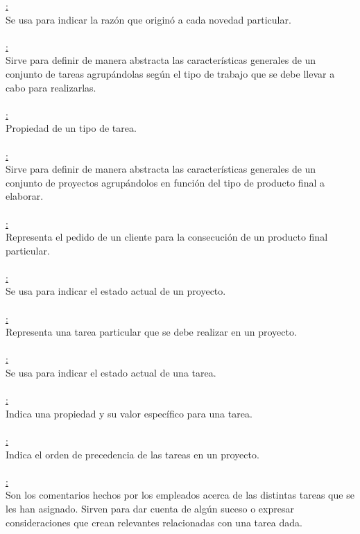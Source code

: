 \documentclass[a4paper, 12pt,twoside]{report}  %
\numberwithin{equation}{subsection} %
\begin{document}
\underline{:}\\
Se usa para indicar la razón que originó a cada novedad particular.\\
\\
\underline{:}\\
Sirve para definir de manera abstracta las características generales de un conjunto de tareas agrupándolas según el tipo de trabajo que se debe llevar a cabo para realizarlas.\\
\\
\underline{:}\\
Propiedad de un tipo de tarea.\\
\\
\underline{:}\\
Sirve para definir de manera abstracta las características generales de un conjunto de proyectos agrupándolos en función del tipo de producto final a elaborar.\\
\\
\underline{:}\\
Representa el pedido de un cliente para la consecución de un producto final particular.\\
\\
\underline{:}\\
Se usa para indicar el estado actual de un proyecto.\\
\\
\underline{:}\\
Representa una tarea particular que se debe realizar en un proyecto.\\
\\
\underline{:}\\
Se usa para indicar el estado actual de una tarea.\\
\\
\underline{:}\\
Indica una propiedad y su valor específico para una tarea.\\
\\
\underline{:}\\
Indica el orden de precedencia de las tareas en un proyecto.\\
\\
\underline{:}\\
Son los comentarios hechos por los empleados acerca de las distintas tareas que se les han asignado. Sirven para dar cuenta de algún suceso o expresar consideraciones que crean relevantes relacionadas con una tarea dada.
\end{document}
